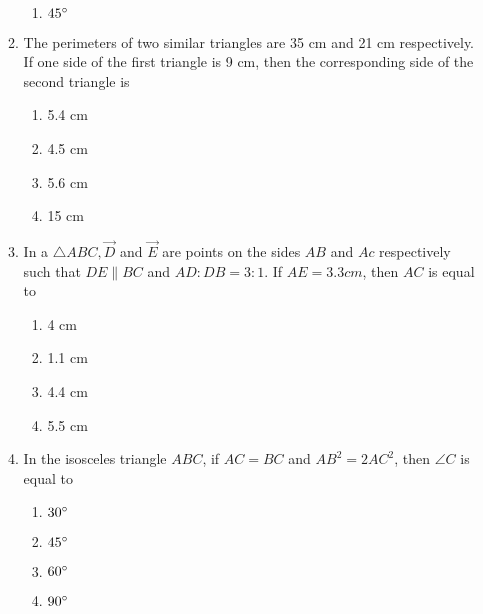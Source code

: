 \begin{enumerate}
\begin{enumerate}
\begin{enumerate}
					\item $ 45{\degree} $
				\end{enumerate}
			\item The perimeters of two similar triangles are 35 cm and 21 cm respectively. If one 
				side of the first triangle is 9 cm, then the corresponding side of the second 
				triangle is
				\begin{enumerate}
					\item 5.4 cm
					\item 4.5 cm
					\item 5.6 cm
					\item 15 cm
				\end{enumerate}
			\item In a $ \triangle ABC, \vec{D} $ and $ \vec{E} $ are points on the sides $ AB $ and 
				$ Ac $ respectively such that $ DE \parallel BC $ and $ AD : DB = 3 :1 $. 
				If $ AE = 3.3 cm $, then $ AC $ is equal to
				\begin{enumerate}
					\item 4 cm
					\item 1.1 cm 
					\item 4.4 cm
					\item 5.5 cm
				\end{enumerate}
			\item In the isosceles triangle $ ABC $, if $ AC = BC $ and $ AB^2 = 2AC^2 $, then $ 
				\angle{C} $ is equal to
				\begin{enumerate}
					\item $ 30{\degree} $
					\item $ 45{\degree} $
					\item $ 60{\degree} $
					\item $ 90{\degree} $
				\end{enumerate}
		\end{enumerate}




\end{enumerate}
%
